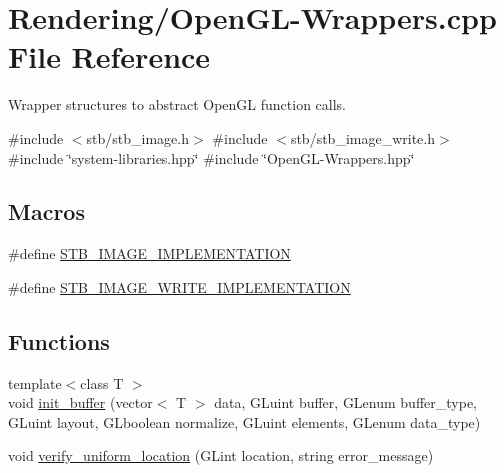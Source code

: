 \hypertarget{OpenGL-Wrappers_8cpp}{}\section{Rendering/\+Open\+G\+L-\/\+Wrappers.cpp File Reference}
\label{OpenGL-Wrappers_8cpp}


Wrapper structures to abstract Open\+GL function calls.  


{\ttfamily \#include $<$stb/stb\+\_\+image.\+h$>$}\newline
{\ttfamily \#include $<$stb/stb\+\_\+image\+\_\+write.\+h$>$}\newline
{\ttfamily \#include \char`\"{}system-\/libraries.\+hpp\char`\"{}}\newline
{\ttfamily \#include \char`\"{}Open\+G\+L-\/\+Wrappers.\+hpp\char`\"{}}\newline
\subsection*{Macros}
\begin{DoxyCompactItemize}
\item 
\#define \mbox{\hyperlink{OpenGL-Wrappers_8cpp_a18372412ad2fc3ce1e3240b3cf0efe78}{S\+T\+B\+\_\+\+I\+M\+A\+G\+E\+\_\+\+I\+M\+P\+L\+E\+M\+E\+N\+T\+A\+T\+I\+ON}}
\item 
\#define \mbox{\hyperlink{OpenGL-Wrappers_8cpp_aefe397a94e8feddc652f92ef40ce9597}{S\+T\+B\+\_\+\+I\+M\+A\+G\+E\+\_\+\+W\+R\+I\+T\+E\+\_\+\+I\+M\+P\+L\+E\+M\+E\+N\+T\+A\+T\+I\+ON}}
\end{DoxyCompactItemize}
\subsection*{Functions}
\begin{DoxyCompactItemize}
\item 
{\footnotesize template$<$class T $>$ }\\void \mbox{\hyperlink{OpenGL-Wrappers_8cpp_a236f522805b8430f9089798521afe030}{init\+\_\+buffer}} (vector$<$ T $>$ data, G\+Luint buffer, G\+Lenum buffer\+\_\+type, G\+Luint layout, G\+Lboolean normalize, G\+Luint elements, G\+Lenum data\+\_\+type)
\item 
void \mbox{\hyperlink{OpenGL-Wrappers_8cpp_a65c85386ba2869ab5ac496344019f122}{verify\+\_\+uniform\+\_\+location}} (G\+Lint location, string error\+\_\+message)
\end{DoxyCompactItemize}
